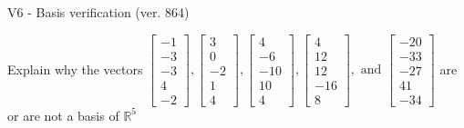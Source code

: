 \begin{exercise}
  \begin{exerciseTitle}V6 - Basis verification (ver. 864)\end{exerciseTitle}
  \begin{exerciseStatement}
    Explain why the vectors \(\left[\begin{array}{r}
-1 \\
-3 \\
-3 \\
4 \\
-2
\end{array}\right] , \left[\begin{array}{r}
3 \\
0 \\
-2 \\
1 \\
4
\end{array}\right] , \left[\begin{array}{r}
4 \\
-6 \\
-10 \\
10 \\
4
\end{array}\right] , \left[\begin{array}{r}
4 \\
12 \\
12 \\
-16 \\
8
\end{array}\right] , \text{ and } \left[\begin{array}{r}
-20 \\
-33 \\
-27 \\
41 \\
-34
\end{array}\right]\) are or are not a basis of \(\mathbb{R}^5\)	



\end{exerciseStatement}
\end{exercise}

